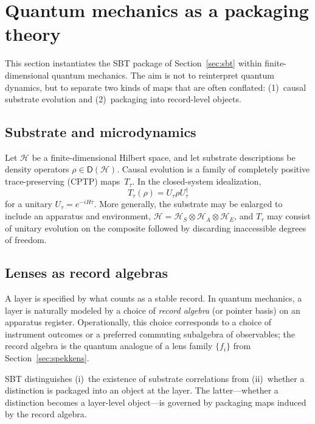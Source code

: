 \section{Quantum mechanics as a packaging theory}\label{sec:qm-package}

This section instantiates the SBT package of Section~\ref{sec:sbt} within finite-dimensional quantum mechanics.
The aim is not to reinterpret quantum dynamics, but to separate two kinds of maps that are often conflated:
(1)~causal substrate evolution and (2)~packaging into record-level objects.

\subsection{Substrate and microdynamics}

Let $\mathcal{H}$ be a finite-dimensional Hilbert space, and let substrate descriptions be density operators
$\rho \in \mathsf{D}(\mathcal{H})$.\cite{NielsenChuang2010QCQI}
Causal evolution is a family of completely positive trace-preserving (CPTP) maps~$T_\tau$.\cite{NielsenChuang2010QCQI}
In the closed-system idealization,
\[
T_\tau(\rho)=U_\tau \rho U_\tau^\dagger
\]
for a unitary $U_\tau = e^{-iH\tau}$.
More generally, the substrate may be enlarged to include an apparatus and environment,
$\mathcal{H}=\mathcal{H}_S\otimes \mathcal{H}_A\otimes \mathcal{H}_E$,
and $T_\tau$ may consist of unitary evolution on the composite followed by discarding inaccessible degrees of freedom.

\subsection{Lenses as record algebras}

A layer is specified by what counts as a stable record.
In quantum mechanics, a layer is naturally modeled by a choice of \emph{record algebra} (or pointer basis) on an apparatus register.\cite{Zurek2003Decoherence}
Operationally, this choice corresponds to a choice of instrument outcomes or a preferred commuting subalgebra of observables;
the record algebra is the quantum analogue of a lens family $\{f_i\}$ from Section~\ref{sec:spekkens}.

SBT distinguishes (i)~the existence of substrate correlations from (ii)~whether a distinction is packaged into an object at the layer.
The latter---whether a distinction becomes a layer-level object---is governed by packaging maps induced by the record algebra.

